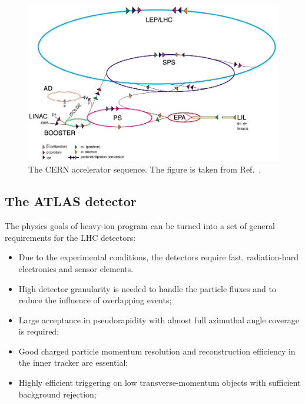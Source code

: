 \begin{figure}[H]
\centering
\includegraphics[width=.95\linewidth]{figs/chapter_detector/cartoon_LHC.jpg}
\caption{The CERN accelerator sequence. The figure is taken from Ref.~\cite{Jean-Luc:841493}.}
\label{fig:detector_cartoon_LHC}
\end{figure}



\subsection{The ATLAS detector}

The physics goals of heavy-ion program can be turned into a set of general requirements for the LHC detectors:
\begin{itemize}
\item Due to the experimental conditions, the detectors require fast, radiation-hard electronics and sensor elements.
\item High detector granularity is needed to handle the particle fluxes and to reduce the influence of overlapping events;
\item Large acceptance in pseudorapidity with almost full azimuthal angle coverage is required;
\item Good charged particle momentum resolution and reconstruction efficiency in the inner tracker are essential;
\item Highly efficient triggering on low transverse-momentum objects with sufficient background rejection;
\end{itemize}

